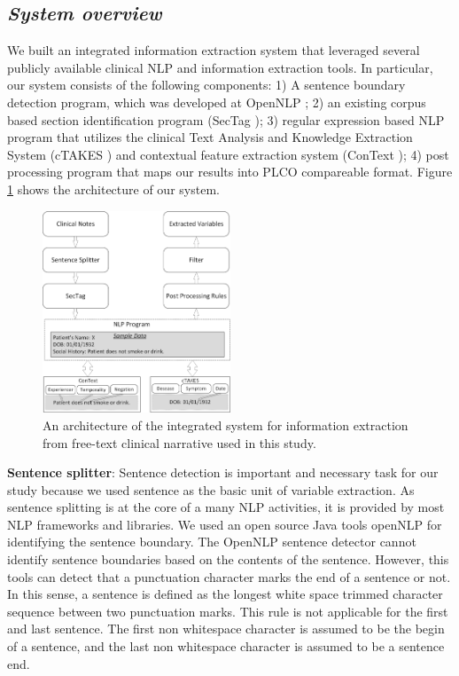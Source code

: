 \documentclass{amia}
\begin{document}
\subsection*{\textit{System overview}}
We built an integrated information extraction system that leveraged several publicly available clinical NLP and information extraction tools. In particular, our system consists of the following components: 1) A sentence boundary detection program, which was developed at OpenNLP \cite{morton2005opennlp}; 2) an existing corpus based section identification program (SecTag \cite{denny2009evaluation}); 3) regular expression based NLP program that utilizes the clinical Text Analysis and Knowledge Extraction System (cTAKES \cite{savova2010mayo}) and contextual feature extraction system (ConText \cite{harkema2009context}); 4) post processing program that maps our results into PLCO compareable format. Figure \ref{fig:extraction} shows the architecture of our system. 

\begin{figure}[h!]
\centering
\includegraphics[width=0.5\textwidth]{figures/extraction.eps}
\caption{An architecture of the integrated system for information extraction from free-text clinical narrative used in this study.}
\label{fig:extraction}
\end{figure}

\textbf {Sentence splitter}: Sentence detection is important and necessary task for our study because we used sentence as the basic unit of variable extraction. As sentence splitting is at the core of a many NLP activities, it is provided by most NLP frameworks and libraries. We used an open source Java tools openNLP for identifying the sentence boundary. The OpenNLP sentence detector cannot identify sentence boundaries based on the contents of the sentence. However, this tools can detect that a punctuation character marks the end of a sentence or not. In this sense, a sentence is defined as the longest white space trimmed character sequence between two punctuation marks. This rule is not applicable for the first and last sentence. The first non whitespace character is assumed to be the begin of a sentence, and the last non whitespace character is assumed to be a sentence end.
\end{document}
